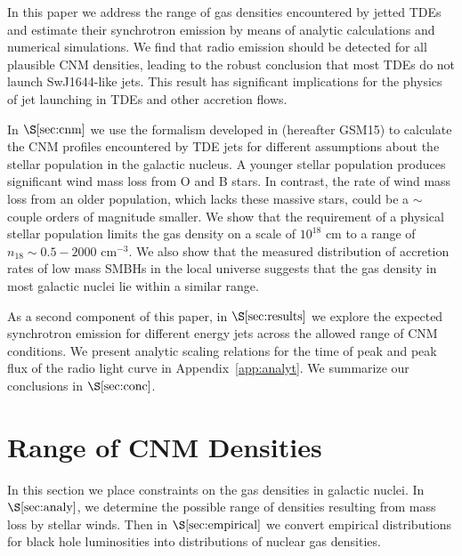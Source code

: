 \documentclass[usenatbib,fleqn]{mnras}
\begin{document}
In this paper we address the range of gas densities encountered by
jetted TDEs and estimate their synchrotron emission by means of
analytic calculations and numerical simulations.  We find that radio
emission should be detected for all plausible CNM densities, leading
to the robust conclusion that most TDEs do not launch SwJ1644-like
jets.  This result has significant implications for the physics of jet
launching in TDEs and other accretion flows.

In $\S\ref{sec:cnm}$ we use the formalism developed in
\citet{Generozov+2015} (hereafter GSM15) to calculate the CNM profiles
encountered by TDE jets for different assumptions about the stellar
population in the galactic nucleus.  A younger stellar population
produces significant wind mass loss from O and B stars. In contrast,
the rate of wind mass loss from an older population, which lacks these
massive stars, could be a $\sim$couple orders of magnitude smaller.
We show that the requirement of a physical stellar population limits
the gas density on a scale of $10^{18}$ cm to a range of $n_{18} \sim
0.5-2000$ cm$^{-3}$. We also show that the measured distribution of
accretion rates of low mass SMBHs in the local universe suggests that
the gas density in most galactic nuclei lie within a similar range.

As a second component of this paper, in $\S\ref{sec:results}$ we
explore the expected synchrotron emission for different energy jets
across the allowed range of CNM conditions. 
We present analytic scaling relations for the time of peak and peak
flux of the radio light curve in Appendix~\ref{app:analyt}. We
summarize our conclusions in $\S\ref{sec:conc}$.

\section{Range of CNM Densities}
\label{sec:cnm}

In this section we place constraints on the gas densities in galactic nuclei.  In $\S\ref{sec:analy}$, we determine the
possible range of densities resulting from mass loss by stellar
winds. Then in $\S\ref{sec:empirical}$ we convert empirical
distributions for black hole luminosities into distributions of
nuclear gas densities.  
\end{document}
